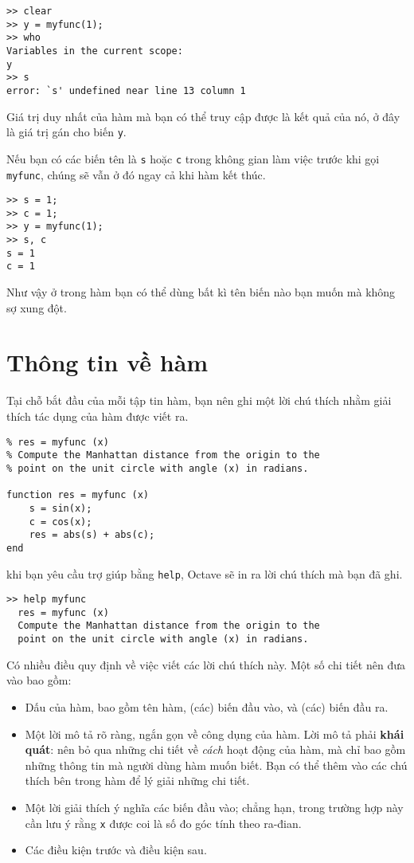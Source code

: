 \documentclass[12pt]{book}
\begin{document}
\begin{verbatim}
>> clear
>> y = myfunc(1);
>> who
Variables in the current scope:
y  
>> s
error: `s' undefined near line 13 column 1
\end{verbatim}
%
Giá trị duy nhất của hàm mà bạn có thể truy cập được là kết quả của
nó, ở đây là giá trị gán cho biến {\tt y}.

Nếu bạn có các biến tên là {\tt s} hoặc {\tt c} trong không gian
làm việc trước khi gọi {\tt myfunc}, chúng sẽ vẫn ở đó ngay cả khi
hàm kết thúc.

\begin{verbatim}
>> s = 1;
>> c = 1;
>> y = myfunc(1);
>> s, c
s = 1
c = 1
\end{verbatim}
%
Như vậy ở trong hàm bạn có thể dùng bất kì tên biến nào bạn muốn
mà không sợ xung đột.


\section{Thông tin về hàm}

Tại chỗ bắt đầu của mỗi tập tin hàm, bạn nên ghi một lời chú thích
nhằm giải thích tác dụng của hàm được viết ra.

\begin{verbatim}
% res = myfunc (x)
% Compute the Manhattan distance from the origin to the
% point on the unit circle with angle (x) in radians.

function res = myfunc (x)
    s = sin(x);
    c = cos(x);
    res = abs(s) + abs(c);
end
\end{verbatim}
%
khi bạn yêu cầu trợ giúp bằng {\tt help}, Octave sẽ in ra
lời chú thích mà bạn đã ghi.

\begin{verbatim}
>> help myfunc
  res = myfunc (x)
  Compute the Manhattan distance from the origin to the
  point on the unit circle with angle (x) in radians.
\end{verbatim}

Có nhiều điều quy định về việc viết các lời chú thích này. 
Một số chi tiết nên đưa vào bao gồm:

\begin{itemize}

\item Dấu của hàm, bao gồm tên hàm, (các) biến đầu vào, và
(các) biến đầu ra.

\item Một lời mô tả rõ ràng, ngắn gọn về công dụng của hàm. 
Lời mô tả phải {\bf khái quát}: nên bỏ qua những chi tiết về
{\em cách} hoạt động của hàm, mà chỉ bao gồm những thông tin 
mà người dùng hàm muốn biết. Bạn có thể thêm vào các chú thích
bên trong hàm để lý giải những chi tiết.

\item Một lời giải thích ý nghĩa các biến đầu vào; chẳng hạn,
trong trường hợp này cần lưu ý rằng {\tt x} được coi là số đo góc
tính theo ra-đian.

\item Các điều kiện trước và điều kiện sau.

\end{itemize}
\end{document}
